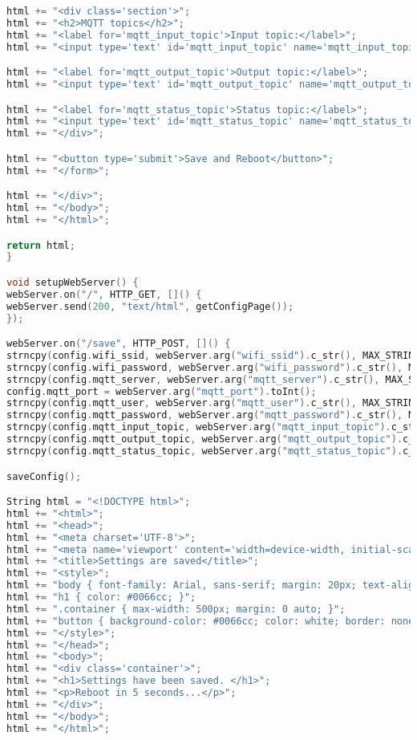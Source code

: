 \begin{lstlisting}[language=C++]
html += "<div class='section'>";
html += "<h2>MQTT topics</h2>";
html += "<label for='mqtt_input_topic'>Input topic:</label>";
html += "<input type='text' id='mqtt_input_topic' name='mqtt_input_topic' value='" + String(config.mqtt_input_topic) + "' required>";

html += "<label for='mqtt_output_topic'>Output topic:</label>";
html += "<input type='text' id='mqtt_output_topic' name='mqtt_output_topic' value='" + String(config.mqtt_output_topic) + "' required>";

html += "<label for='mqtt_status_topic'>Status topic:</label>";
html += "<input type='text' id='mqtt_status_topic' name='mqtt_status_topic' value='" + String(config.mqtt_status_topic) + "' required>";
html += "</div>";

html += "<button type='submit'>Save and Reboot</button>";
html += "</form>";

html += "</div>";
html += "</body>";
html += "</html>";

return html;
}

void setupWebServer() {
webServer.on("/", HTTP_GET, []() {
webServer.send(200, "text/html", getConfigPage());
});

webServer.on("/save", HTTP_POST, []() {
strncpy(config.wifi_ssid, webServer.arg("wifi_ssid").c_str(), MAX_STRING_LENGTH);
strncpy(config.wifi_password, webServer.arg("wifi_password").c_str(), MAX_STRING_LENGTH);
strncpy(config.mqtt_server, webServer.arg("mqtt_server").c_str(), MAX_STRING_LENGTH);
config.mqtt_port = webServer.arg("mqtt_port").toInt();
strncpy(config.mqtt_user, webServer.arg("mqtt_user").c_str(), MAX_STRING_LENGTH);
strncpy(config.mqtt_password, webServer.arg("mqtt_password").c_str(), MAX_STRING_LENGTH);
strncpy(config.mqtt_input_topic, webServer.arg("mqtt_input_topic").c_str(), MAX_STRING_LENGTH);
strncpy(config.mqtt_output_topic, webServer.arg("mqtt_output_topic").c_str(), MAX_STRING_LENGTH);
strncpy(config.mqtt_status_topic, webServer.arg("mqtt_status_topic").c_str(), MAX_STRING_LENGTH);

saveConfig();

String html = "<!DOCTYPE html>";
html += "<html>";
html += "<head>";
html += "<meta charset='UTF-8'>";
html += "<meta name='viewport' content='width=device-width, initial-scale=1.0'>";
html += "<title>Settings are saved</title>";
html += "<style>";
html += "body { font-family: Arial, sans-serif; margin: 20px; text-align: center; }";
html += "h1 { color: #0066cc; }";
html += ".container { max-width: 500px; margin: 0 auto; }";
html += "button { background-color: #0066cc; color: white; border: none; padding: 10px 20px; margin-top: 20px; cursor: pointer; }";
html += "</style>";
html += "</head>";
html += "<body>";
html += "<div class='container'>";
html += "<h1>Settings have been saved. </h1>";
html += "<p>Reboot in 5 seconds...</p>";
html += "</div>";
html += "</body>";
html += "</html>";


\end{lstlisting}
